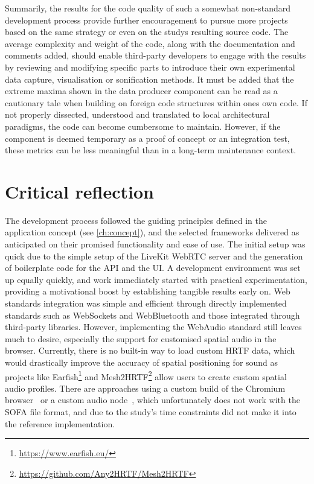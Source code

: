 Summarily, the results for the code quality of such a somewhat non-standard development process provide further encouragement to pursue more projects based on the same strategy or even on the study\textquotesingle s resulting source code.
The average complexity and weight of the code, along with the documentation and comments added, should enable third-party developers to engage with the results by reviewing and modifying specific parts to introduce their own experimental data capture, visualisation or sonification methods.
It must be added that the extreme maxima shown in the data producer component can be read as a cautionary tale when building on foreign code structures within one\textquotesingle s own code.
If not properly dissected, understood and translated to local architectural paradigms, the code can become cumbersome to maintain.
However, if the component is deemed temporary as a proof of concept or an integration test, these metrics can be less meaningful than in a long-term maintenance context.

\section{Critical reflection}
\label{sec:critical-evaluation}

The development process followed the guiding principles defined in the application concept (see \autoref{ch:concept}), and the selected frameworks delivered as anticipated on their promised functionality and ease of use.
The initial setup was quick due to the simple setup of the LiveKit \ac{WebRTC} server and the generation of boilerplate code for the \ac{API} and the \ac{UI}.
A development environment was set up equally quickly, and work immediately started with practical experimentation, providing a motivational boost by establishing tangible results early on.
Web standards integration was simple and efficient through directly implemented standards such as WebSockets and WebBluetooth and those integrated through third-party libraries.
However, implementing the WebAudio standard still leaves much to desire, especially the support for customised spatial audio in the browser.
Currently, there is no built-in way to load custom \ac{HRTF} data, which would drastically improve the accuracy of spatial positioning for sound as projects like Earfish\footnote{\url{https://www.earfish.eu/}} and Mesh2HRTF\footnote{\url{https://github.com/Any2HRTF/Mesh2HRTF}} allow users to create custom spatial audio profiles.
There are approaches using a custom build of the Chromium browser~\parencite{chromiumCustomHrtf} or a custom audio node~\parencite{customHrtfAudioNode}, which unfortunately does not work with the \ac{SOFA} file format, and due to the study's time constraints did not make it into the reference implementation.

